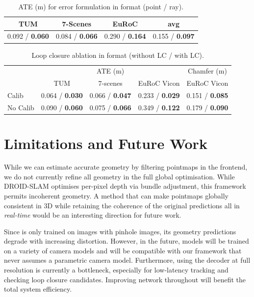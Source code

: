 \documentclass[10pt,twocolumn,letterpaper]{article}
\begin{document}
\begin{table}[!t]
    \centering
        \caption{ATE (m) for error formulation in format (point / ray).}\label{tab:ablation_point_ray}
        \scriptsize
        \begin{tabular}{ccc|c} %
        TUM &7-Scenes &EuRoC &avg \\
        \hline
        0.092 / \textbf{0.060} &0.084 / \textbf{0.066} &0.290 / \textbf{0.164} &0.155 / \textbf{0.097}\\
        \bottomrule
        \end{tabular}
\end{table}

\begin{table}[!t]\centering
\caption{Loop closure ablation in format (without LC / with LC).} \label{tab:loop_closure}
\scriptsize
\begin{tabular}{l|ccc|c}
& \multicolumn{3}{c|}{ATE (m)} &Chamfer (m) \\
& TUM &7-scenes & EuRoC Vicon & EuRoC Vicon \\ \hline
Calib & 0.064 / \textbf{0.030} &0.066 / \textbf{0.047} &0.233 / \textbf{0.029} &0.151 / \textbf{0.085} \\
No Calib & 0.090 / \textbf{0.060} &0.075 / \textbf{0.066} &0.349 / \textbf{0.122} &0.179 / \textbf{0.090} \\
\bottomrule
\end{tabular}
\end{table}

\section{Limitations and Future Work}
\label{sec:limitations}

While we can estimate accurate geometry by filtering pointmaps in the frontend, we do not currently refine all geometry in the full global optimisation.  While DROID-SLAM optimises per-pixel depth via bundle adjustment, this framework permits incoherent geometry.  A method that can make pointmaps globally consistent in 3D while retaining the coherence of the original \master predictions all in \textit{real-time} would be an interesting direction for future work.

Since \master is only trained on images with pinhole images, its geometry predictions degrade with increasing distortion.  However, in the future, models will be trained on a variety of camera models and will be compatible with our framework that never assumes a parametric camera model.  Furthermore, using the decoder at full resolution is currently a bottleneck, especially for low-latency tracking and checking loop closure candidates.  Improving network throughout will benefit the total system efficiency.
\end{document}
